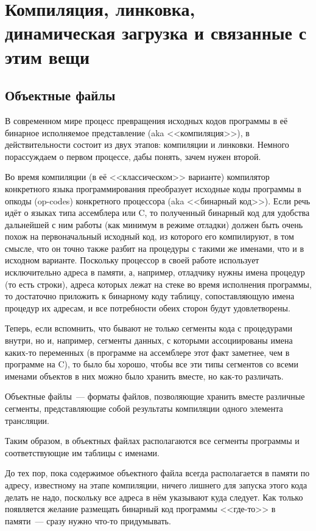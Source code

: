 \section{Компиляция, линковка, динамическая загрузка и связанные с этим вещи}
\subsection{Объектные файлы}
В современном мире процесс превращения исходных кодов программы в её бинарное исполняемое представление (aka <<компиляция>>), в действительности состоит из двух этапов: компиляции и линковки.
Немного порассуждаем о первом процессе, дабы понять, зачем нужен второй.

Во время компиляции (в её <<классическом>> варианте) компилятор конкретного языка программирования преобразует исходные коды программы в опкоды (op-codes) конкретного процессора (aka <<бинарный код>>).
Если речь идёт о языках типа ассемблера или C, то полученный бинарный код для удобства дальнейшей с ним работы (как минимум в режиме отладки) должен быть очень похож на первоначальный исходный код, из которого его компилируют, в том смысле, что он точно также разбит на процедуры с такими же именами, что и в исходном варианте.
Поскольку процессор в своей работе использует исключительно адреса в памяти, а, например, отладчику нужны имена процедур (то есть строки), адреса которых лежат на стеке во время исполнения программы, то достаточно приложить к бинарному коду таблицу, сопоставляющую имена процедур их адресам, и все потребности обеих сторон будут удовлетворены.

Теперь, если вспомнить, что бывают не только сегменты кода с процедурами внутри, но и, например, сегменты данных, с которыми ассоциированы имена каких-то переменных (в программе на ассемблере этот факт заметнее, чем в программе на C), то было бы хорошо, чтобы все эти типы сегментов со всеми именами объектов в них можно было хранить вместе, но как-то различать.

\begin{definition}
Объектные файлы~--- форматы файлов, позволяющие хранить вместе различные сегменты, представляющие собой результаты компиляции одного элемента трансляции.
\end{definition}

Таким образом, в объектных файлах располагаются все сегменты программы и соответствующие им таблицы с именами.

До тех пор, пока содержимое объектного файла всегда располагается в памяти по адресу, известному на этапе компиляции, ничего лишнего для запуска этого кода делать не надо, поскольку все адреса в нём указывают куда следует.
Как только появляется желание размещать бинарный код программы <<где-то>> в памяти~--- сразу нужно что-то придумывать.

